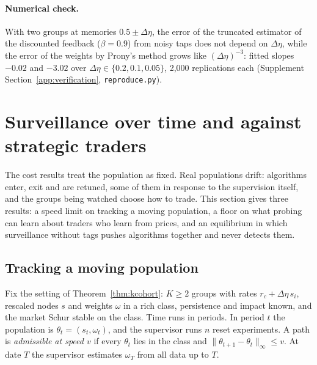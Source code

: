 \documentclass[12pt]{article}
\theoremstyle{definition}
\theoremstyle{remark}
\begin{document}
\paragraph{Numerical check.} With two groups at memories $0.5\pm\Delta\eta$, the error of the truncated estimator of the discounted feedback ($\beta=0.9$) from noisy taps does not depend on $\Delta\eta$, while the error of the weights by Prony's method grows like $(\Delta\eta)^{-3}$: fitted slopes $-0.02$ and $-3.02$ over $\Delta\eta\in\{0.2,0.1,0.05\}$, 2,000 replications each (Supplement Section~\ref{app:verification}, \nolinkurl{reproduce.py}).

\section{Surveillance over time and against strategic traders}\label{app:dynamic}

The cost results treat the population as fixed. Real populations drift: algorithms enter, exit and are retuned, some of them in response to the supervision itself, and the groups being watched choose how to trade. This section gives three results: a speed limit on tracking a moving population, a floor on what probing can learn about traders who learn from prices, and an equilibrium in which surveillance without tags pushes algorithms together and never detects them.

\subsection{Tracking a moving population}

Fix the setting of Theorem~\ref{thm:kcohort}: $K\ge2$ groups with rates $r_c+\Delta\eta\,s_i$, rescaled nodes $s$ and weights $\omega$ in a rich class, persistence and impact known, and the market Schur stable on the class. Time runs in periods. In period $t$ the population is $\theta_t=(s_t,\omega_t)$, and the supervisor runs $n$ reset experiments. A path is \emph{admissible at speed $v$} if every $\theta_t$ lies in the class and $\|\theta_{t+1}-\theta_t\|_\infty\le v$. At date $T$ the supervisor estimates $\omega_T$ from all data up to $T$.
\end{document}
